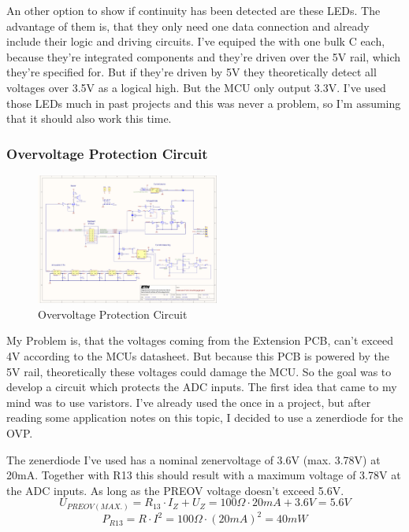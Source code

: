 An other option to show if continuity has been detected are these LEDs. The advantage of them is, that they only need one data connection and already include their logic and driving circuits. I've equiped the with one bulk C each, because they're integrated components and they're driven over the 5V rail, which they're specified for. But if they're driven by 5V they theoretically detect all voltages over 3.5V as a logical high. But the MCU only output 3.3V. I've used those LEDs much in past projects and this was never a problem, so I'm assuming that it should also work this time.



\subsubsection{Overvoltage Protection Circuit}

\begin{figure}[H]
	\centering
	\includegraphics[width=6cm, trim={17cm 9.5cm 19cm 15.5cm}, clip]{Resources/Pictures/Schematic_PCB_EXTENSION_CircuitVoyager_pre1.pdf}
	\caption{Overvoltage Protection Circuit}
	\label{fig:Overvoltage Protection Circuit}
\end{figure}

My Problem is, that the voltages coming from  the Extension PCB, can't exceed 4V according to the MCUs datasheet. But because this PCB is powered by the 5V rail, theoretically these voltages could damage the MCU. So the goal was to develop a circuit which protects the ADC inputs. The first idea that came to my mind was to use varistors. I've already used the once in a project, but after reading some application notes on this topic, I decided to use a zenerdiode for the OVP. \cite{Protecting_ADC_Inputs_AN}

The zenerdiode I've used has a nominal zenervoltage of 3.6V (max. 3.78V) at 20mA. Together with R13 this should result with a maximum voltage of 3.78V at the ADC inputs. As long as the PREOV voltage doesn't exceed 5.6V.
\[U_{PREOV(MAX.)} = R_{13} \cdot I_Z + U_Z = 100\Omega \cdot 20mA + 3.6V = 5.6V\]
\[P_{R13} = R \cdot I^2 = 100\Omega \cdot (20mA)^2 = 40mW\]


